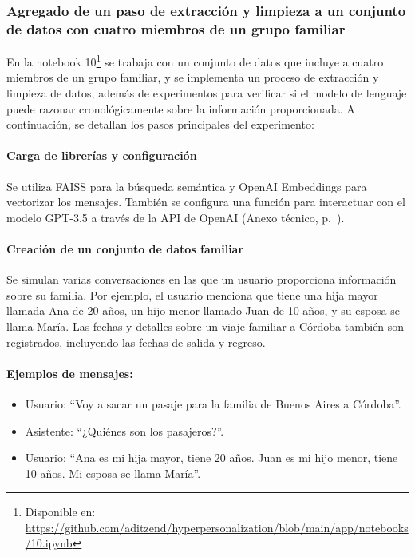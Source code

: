 \subsubsection{Agregado de un paso de extracción y limpieza a un conjunto de datos con cuatro miembros de un grupo familiar}

En la notebook 10\footnote{Disponible en: \url{https://github.com/aditzend/hyperpersonalization/blob/main/app/notebooks/10.ipynb}} se trabaja con un conjunto de datos que incluye a cuatro miembros de un grupo familiar, y se implementa un proceso de extracción y limpieza de datos, además de experimentos para verificar si el modelo de lenguaje puede razonar cronológicamente sobre la información proporcionada. A continuación, se detallan los pasos principales del experimento:

\paragraph{Carga de librerías y configuración}

Se utiliza FAISS para la búsqueda semántica y OpenAI Embeddings para vectorizar los mensajes. También se configura una función para interactuar con el modelo GPT-3.5 a través de la API de OpenAI (Anexo técnico, p.~\pageref{anexo:code-4-1-10-1}).

\paragraph{Creación de un conjunto de datos familiar}

Se simulan varias conversaciones en las que un usuario proporciona información sobre su familia. Por ejemplo, el usuario menciona que tiene una hija mayor llamada Ana de 20 años, un hijo menor llamado Juan de 10 años, y su esposa se llama María. Las fechas y detalles sobre un viaje familiar a Córdoba también son registrados, incluyendo las fechas de salida y regreso.

\paragraph{Ejemplos de mensajes:}
\begin{itemize}
    \item Usuario: ``Voy a sacar un pasaje para la familia de Buenos Aires a Córdoba''.
    \item Asistente: ``¿Quiénes son los pasajeros?''.
    \item Usuario: ``Ana es mi hija mayor, tiene 20 años. Juan es mi hijo menor, tiene 10 años. Mi esposa se llama María''.
\end{itemize}

